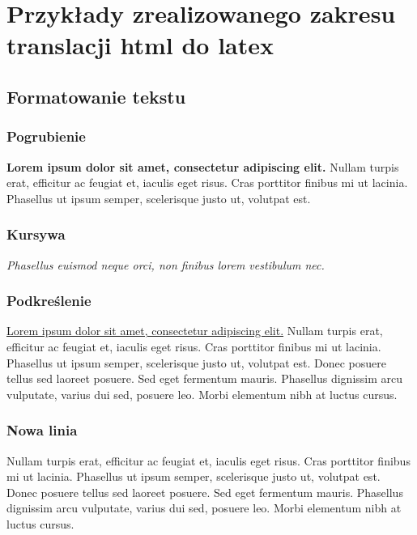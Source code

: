 \documentclass{report}
\begin{document}
    \chapter{Przykłady zrealizowanego zakresu translacji html do latex}

    \section{Formatowanie tekstu}
        \subsection{Pogrubienie}
            \textbf{Lorem ipsum dolor sit amet, consectetur adipiscing elit.} 
            Nullam turpis erat, efficitur ac feugiat et, iaculis eget 
            risus. Cras porttitor finibus mi ut lacinia. Phasellus ut 
            ipsum semper, scelerisque justo ut, volutpat est. 

        \subsection{Kursywa}
            \textit{Phasellus euismod neque orci, non finibus lorem vestibulum nec.}

        \subsection{Podkreślenie}
            \underline{Lorem ipsum dolor sit amet, consectetur adipiscing elit.} 
            Nullam turpis erat, efficitur ac feugiat et, iaculis eget 
            risus. Cras porttitor finibus mi ut lacinia. Phasellus ut 
            ipsum semper, scelerisque justo ut, volutpat est. Donec posuere 
            tellus sed laoreet posuere. Sed eget fermentum mauris. Phasellus 
            dignissim arcu vulputate, varius dui sed, posuere leo. Morbi 
            elementum nibh at luctus cursus.
        
        \subsection{Nowa linia}
            Nullam turpis erat, efficitur ac feugiat et, iaculis eget 
            risus. Cras porttitor finibus mi ut lacinia. Phasellus ut 
            ipsum semper, scelerisque justo ut, volutpat est. \newline Donec posuere 
            tellus sed laoreet posuere. Sed eget fermentum mauris. Phasellus 
            dignissim arcu vulputate, varius dui sed, posuere leo. Morbi 
            elementum nibh at luctus cursus. 
\end{document}
